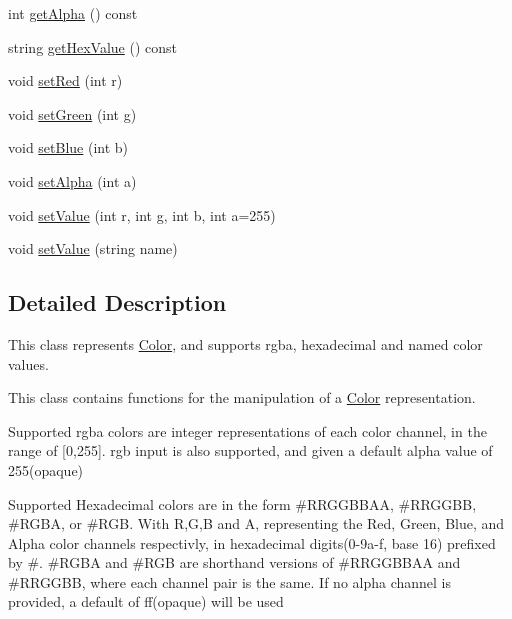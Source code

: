 \begin{DoxyCompactItemize}
int \mbox{\hyperlink{classbridges_1_1_color_a61523716f5597013d57bc98eae1fe96a}{get\+Alpha}} () const
\item 
string \mbox{\hyperlink{classbridges_1_1_color_a051fa9e828ce7025093c65c46358a8cf}{get\+Hex\+Value}} () const
\item 
void \mbox{\hyperlink{classbridges_1_1_color_a6d7521acce040aca88645f6ad1bf5f44}{set\+Red}} (int r)
\item 
void \mbox{\hyperlink{classbridges_1_1_color_a7689ebb07ae20ad846827e4f42546ba8}{set\+Green}} (int g)
\item 
void \mbox{\hyperlink{classbridges_1_1_color_a3b0e703dd68d7e695664264908e0f709}{set\+Blue}} (int b)
\item 
void \mbox{\hyperlink{classbridges_1_1_color_ab139e842be237a8963d46c6a3edb488d}{set\+Alpha}} (int a)
\item 
void \mbox{\hyperlink{classbridges_1_1_color_a3d6c66d33bd8a702a4436925c9cbd1fd}{set\+Value}} (int r, int g, int b, int a=255)
\item 
void \mbox{\hyperlink{classbridges_1_1_color_aa6e1db9aa47275ef829ac0fa96d72190}{set\+Value}} (string name)
\end{DoxyCompactItemize}


\subsection{Detailed Description}
This class represents \mbox{\hyperlink{classbridges_1_1_color}{Color}}, and supports rgba, hexadecimal and named color values. 

This class contains functions for the manipulation of a \mbox{\hyperlink{classbridges_1_1_color}{Color}} representation.

Supported rgba colors are integer representations of each color channel, in the range of \mbox{[}0,255\mbox{]}. rgb input is also supported, and given a default alpha value of 255(opaque)

Supported Hexadecimal colors are in the form \#\+R\+R\+G\+G\+B\+B\+AA, \#\+R\+R\+G\+G\+BB, \#\+R\+G\+BA, or \#\+R\+GB. With R,G,B and A, representing the Red, Green, Blue, and Alpha color channels respectivly, in hexadecimal digits(0-\/9a-\/f, base 16) prefixed by \textquotesingle{}\#\textquotesingle{}. \#\+R\+G\+BA and \#\+R\+GB are shorthand versions of \#\+R\+R\+G\+G\+B\+B\+AA and \#\+R\+R\+G\+G\+BB, where each channel pair is the same. If no alpha channel is provided, a default of \textquotesingle{}ff\textquotesingle{}(opaque) will be used

